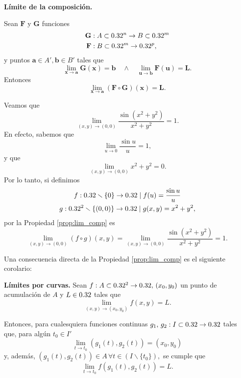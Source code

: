 \begin{propertie} \textbf{L\'imite de la composici\'on.} \label{prop:lim_comp}
\mbox{}

Sean $\mathbf{F}$ y $\mathbf{G}$ funciones 
\begin{align*}
 \mathbf{G} &:A \subset 0.32^n \to B \subset 0.32^m \\
 \mathbf{F} &:B \subset 0.32^m \to 0.32^p,
\end{align*}
y puntos $\mathbf{a} \in A', \mathbf{b} \in B'$ tales que 
\[
 \lim_{\mathbf{x} \to \mathbf{a}} \mathbf{G}(\mathbf{x}) = \mathbf{b} \quad \wedge \quad \lim_{\mathbf{u} \to \mathbf{b}} \mathbf{F}(\mathbf{u}) = \mathbf{L}.
\]
Entonces
\[
 \lim_{\mathbf{x} \to \mathbf{a}} \left( \mathbf{F} \circ \mathbf{G} \right)(\mathbf{x}) = \mathbf{L}.
\]
\end{propertie}
\begin{example}
 Veamos que 
 \[
  \lim_{(x,y) \to (0,0)} \frac{\sin(x^2 + y^2)}{x^2 + y^2} = 1.
 \]
 En efecto, sabemos que 
  \[
    \lim_{u \to 0} \frac{\sin u}{u} = 1,
  \]
  y que
  \[
    \lim_{(x,y) \to (0,0)} x^2 + y^2 = 0.
  \]  
  Por lo tanto, si definimos 
  \begin{gather*}
   f: 0.32 \smallsetminus \{0\} \to 0.32 \;|\;f(u) = \frac{\sin u}{u} \\
   g: 0.32^2 \smallsetminus \{(0,0)\} \to 0.32 \;|\; g(x,y) = x^2 + y^2,
  \end{gather*}
  por la Propiedad \ref{prop:lim_comp} es
  \[
   \lim_{(x,y) \to (0,0)} \left( f \circ g \right)(x,y) = 
   \lim_{(x,y) \to (0,0)} \frac{\sin(x^2 + y^2)}{x^2 + y^2} = 1.
  \]
\end{example}

Una consecuencia directa de la Propiedad \ref{prop:lim_comp} es el siguiente corolario: 
\begin{corollary} \textbf{L\'imites por curvas.} \label{cor:lim_curva}
  Sean $f: A \subset 0.32^2 \to 0.32, \, (x_0,y_0)$ un punto de acumulaci\'on de $A$ y $L \in 0.32$ tales que 
  \[
   \lim_{(x,y) \to (x_0,y_0)} f(x,y) = L.
  \]

  Entonces, para cualesquiera funciones continuas $g_1, \, g_2 : I \subset 0.32 \to 0.32$ tales que, para alg\'un $t_0 \in I'$
  \[
    \lim_{t \to t_0} \left( g_1(t),g_2(t) \right) = \left( x_0 , y_0 \right)
  \]
  y, adem\'as, $\left( g_1(t), g_2(t) \right) \in A \, \forall t \in \left( I \smallsetminus \{t_0\} \right),$ se cumple que
  \[
   \lim_{t \to t_0} f\left( g_1(t),g_2(t) \right) = L.
  \]
\end{corollary}

